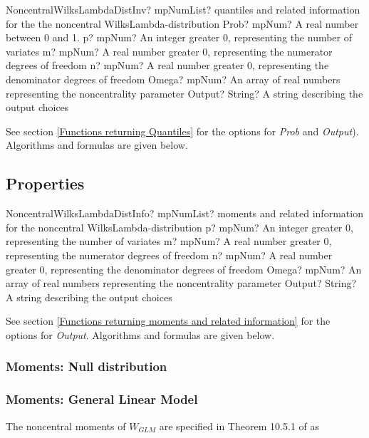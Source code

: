 \begin{mpFunctionsExtract}
	\mpFunctionSixNotImplemented
	{NoncentralWilksLambdaDistInv? mpNumList? quantiles and related information for the the noncentral WilksLambda-distribution}
	{Prob? mpNum? A real number between 0 and 1.}
	{p? mpNum? An integer greater 0, representing the number of variates}
	{m? mpNum? A real number greater 0, representing the numerator  degrees of freedom}
	{n? mpNum? A real number greater 0, representing the denominator degrees of freedom}
	{Omega? mpNum? An array of real numbers representing the noncentrality parameter}
	{Output? String? A string describing the output choices}
\end{mpFunctionsExtract}

See section \ref{Functions returning Quantiles} for the options for  {\itshape\sffamily Prob} and {\itshape\sffamily Output}). Algorithms and formulas are given below.






\subsection{Properties}
\label{WilksLambdaDistributionDistributionProperties_MANOVA}

\begin{mpFunctionsExtract}
	\mpFunctionFiveNotImplemented
	{NoncentralWilksLambdaDistInfo? mpNumList? moments and related information for the noncentral WilksLambda-distribution}
	{p? mpNum? An integer greater 0, representing the number of variates}
	{m? mpNum? A real number greater 0, representing the numerator  degrees of freedom}
	{n? mpNum? A real number greater 0, representing the denominator degrees of freedom}
	{Omega? mpNum? An array of real numbers representing the noncentrality parameter}
	{Output? String? A string describing the output choices}
\end{mpFunctionsExtract}

\vspace{0.3cm}

See section \ref{Functions returning moments and related information} for the options for {\itshape\sffamily Output}. Algorithms and formulas are given below.


\subsubsection{Moments: Null distribution}

\subsubsection{Moments: General Linear Model}
The noncentral moments of $W_{GLM}$ are specified in Theorem 10.5.1 of \cite{Muirhead_1982} as

